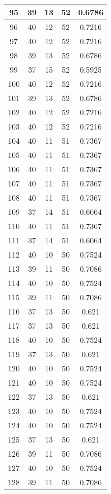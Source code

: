 \documentclass[letterpaper, 12pt]{article}
\begin{document}
\begin{longtable}{|c|c|c|c|c|}
\hline
95 & 39 & 13 & 52 & 0.6786 \\
\hline
96 & 40 & 12 & 52 & 0.7216 \\
\hline
97 & 40 & 12 & 52 & 0.7216 \\
\hline
98 & 39 & 13 & 52 & 0.6786 \\
\hline
99 & 37 & 15 & 52 & 0.5925 \\
\hline
100 & 40 & 12 & 52 & 0.7216 \\
\hline
101 & 39 & 13 & 52 & 0.6786 \\
\hline
102 & 40 & 12 & 52 & 0.7216 \\
\hline
103 & 40 & 12 & 52 & 0.7216 \\
\hline
104 & 40 & 11 & 51 & 0.7367 \\
\hline
105 & 40 & 11 & 51 & 0.7367 \\
\hline
106 & 40 & 11 & 51 & 0.7367 \\
\hline
107 & 40 & 11 & 51 & 0.7367 \\
\hline
108 & 40 & 11 & 51 & 0.7367 \\
\hline
109 & 37 & 14 & 51 & 0.6064 \\
\hline
110 & 40 & 11 & 51 & 0.7367 \\
\hline
111 & 37 & 14 & 51 & 0.6064 \\
\hline
112 & 40 & 10 & 50 & 0.7524 \\
\hline
113 & 39 & 11 & 50 & 0.7086 \\
\hline
114 & 40 & 10 & 50 & 0.7524 \\
\hline
115 & 39 & 11 & 50 & 0.7086 \\
\hline
116 & 37 & 13 & 50 & 0.621 \\
\hline
117 & 37 & 13 & 50 & 0.621 \\
\hline
118 & 40 & 10 & 50 & 0.7524 \\
\hline
119 & 37 & 13 & 50 & 0.621 \\
\hline
120 & 40 & 10 & 50 & 0.7524 \\
\hline
121 & 40 & 10 & 50 & 0.7524 \\
\hline
122 & 37 & 13 & 50 & 0.621 \\
\hline
123 & 40 & 10 & 50 & 0.7524 \\
\hline
124 & 40 & 10 & 50 & 0.7524 \\
\hline
125 & 37 & 13 & 50 & 0.621 \\
\hline
126 & 39 & 11 & 50 & 0.7086 \\
\hline
127 & 40 & 10 & 50 & 0.7524 \\
\hline
128 & 39 & 11 & 50 & 0.7086 \\

\end{longtable}
\end{document}
